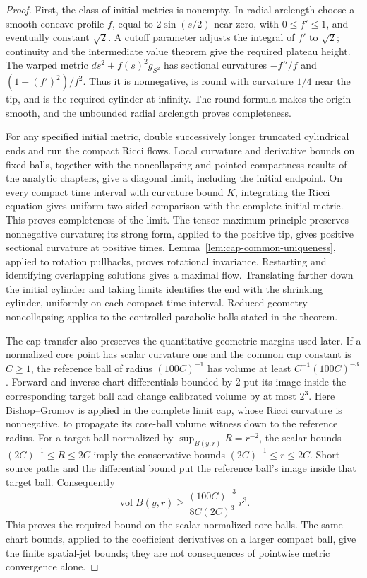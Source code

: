 \begin{proof}
First, the class of initial metrics is nonempty.  In radial arclength choose
a smooth concave profile $f$, equal to $2\sin(s/2)$ near zero, with
$0\leq f'\leq1$, and eventually constant $\sqrt2$.
A cutoff parameter adjusts the integral of $f'$ to $\sqrt2$; continuity
and the intermediate value theorem give the required plateau height.
The warped metric $ds^2+f(s)^2g_{S^2}$ has sectional curvatures
$-f''/f$ and $(1-(f')^2)/f^2$.  Thus it is nonnegative, is round with
curvature $1/4$ near the tip, and is the required cylinder at infinity.
The round formula makes the origin smooth, and the unbounded radial
arclength proves completeness.

For any specified initial metric, double successively longer truncated
cylindrical ends and run the compact Ricci flows.  Local curvature and
derivative bounds on fixed balls, together with the noncollapsing and
pointed-compactness results of the analytic chapters, give a diagonal
limit, including the initial endpoint.  On every compact time interval
with curvature bound $K$, integrating the Ricci equation gives uniform
two-sided comparison with the complete initial metric.  This proves
completeness of the limit.  The tensor maximum principle preserves
nonnegative curvature; its strong form, applied to the positive tip,
gives positive sectional curvature at positive times.
Lemma~\ref{lem:cap-common-uniqueness}, applied to rotation pullbacks, proves rotational
invariance.  Restarting and identifying overlapping solutions gives a
maximal flow.  Translating farther down the initial cylinder and taking
limits identifies the end with the shrinking cylinder, uniformly on
each compact time interval.  Reduced-geometry noncollapsing applies to
the controlled parabolic balls stated in the theorem.

The cap transfer also preserves the quantitative geometric margins used
later.  If a normalized core point has scalar curvature one and the
common cap constant is $C\geq1$, the reference ball of radius
$(100C)^{-1}$ has volume at least
$C^{-1}(100C)^{-3}$.  Forward and inverse chart differentials bounded
by $2$ put its image inside the corresponding target ball and change
calibrated volume by at most $2^3$.  Here Bishop--Gromov is applied in
the complete limit cap, whose Ricci curvature is nonnegative, to propagate
its core-ball volume witness down to the reference radius.  For a target
ball normalized by $\sup_{B(y,r)}R=r^{-2}$, the scalar bounds
$(2C)^{-1}\leq R\leq2C$ imply the conservative bounds
$(2C)^{-1}\leq r\leq2C$.  Short source paths and the differential
bound put the reference ball's image inside that target ball.  Consequently
\[
 \operatorname{vol}B(y,r)\geq
 \frac{(100C)^{-3}}{8C(2C)^3}\,r^3.
\]
This proves the required bound on the scalar-normalized core balls.
The same chart
bounds, applied to the coefficient derivatives on a larger compact ball,
give the finite spatial-jet bounds; they are not consequences of pointwise
metric convergence alone.


\end{proof}
